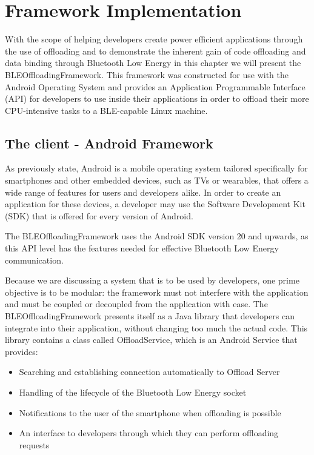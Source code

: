 \chapter{Framework Implementation}
\label{chapter:implementation}

With the scope of helping developers create power efficient applications through the use of offloading and to demonstrate the inherent gain of code offloading and data binding through Bluetooth Low Energy in this chapter we will present the BLEOffloadingFramework. This framework was constructed for use with the Android Operating System and provides an Application Programmable Interface (API) for developers to use inside their applications in order to offload their more CPU-intensive tasks to a BLE-capable Linux machine.


\section{The client - Android Framework}

As previously state, Android is a mobile operating system tailored specifically for smartphones and other embedded devices, such as TVs or wearables, that offers a wide range of features for users and developers alike. In order to create an application for these devices, a developer may use the Software Development Kit (SDK)  that is offered for every version of Android.

The BLEOffloadingFramework uses the Android SDK version 20 and upwards, as this API level has the features needed for effective Bluetooth Low Energy communication.

Because we are discussing a system that is to be used by developers, one prime objective is to be modular: the framework must not interfere with the application and must be coupled or decoupled from the application with ease. The BLEOffloadingFramework presents itself as a Java library that developers can integrate into their application, without changing too much the actual code. This library contains a class called OffloadService, which is an Android Service that provides:

\begin{itemize}

\item{Searching and establishing connection automatically to Offload Server}

\item{Handling of the lifecycle of the Bluetooth Low Energy socket}

\item{Notifications to the user of the smartphone when offloading is possible}

\item{An interface to developers through which they can perform offloading requests}

\end{itemize}


